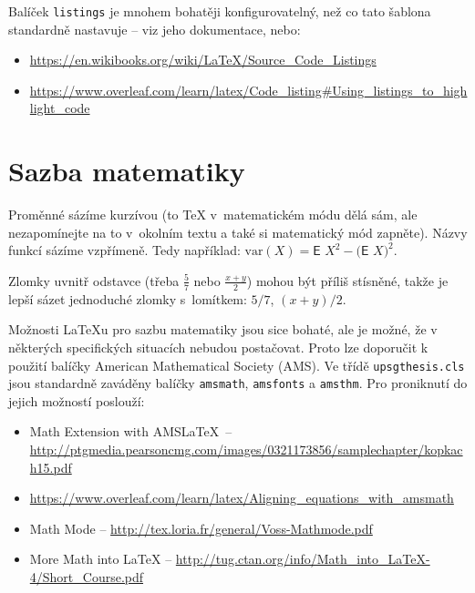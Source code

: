 
Balíček \texttt{listings} je mnohem bohatěji konfigurovatelný, než co tato šablona standardně nastavuje -- viz jeho dokumentace, nebo:
\begin{itemize}
\item \url{https://en.wikibooks.org/wiki/LaTeX/Source_Code_Listings}
\item \url{https://www.overleaf.com/learn/latex/Code_listing#Using_listings_to_highlight_code}
\end{itemize}


\section{Sazba matematiky}
Proměnné sázíme kurzívou (to \TeX{} v~matematickém módu dělá sám, ale
nezapomínejte na to v~okolním textu a také si matematický mód zapněte).
Názvy funkcí sázíme vzpřímeně. Tedy například:
$\textrm{var} (X) = \textsf{E~} X^2 - \bigl(\textsf{E~} X \bigr)^2$.

Zlomky uvnitř odstavce (třeba $$ nebo $$) mohou
být příliš stísněné, takže je lepší sázet jednoduché zlomky s~lomítkem:
$5/7$, $(x+y)/2$.

Možnosti \LaTeX u pro sazbu matematiky jsou sice bohaté, ale je možné, že v některých specifických situacích nebudou postačovat. Proto lze doporučit k použití balíčky American Mathematical Society (AMS). Ve třídě \texttt{upsgthesis.cls} jsou standardně zaváděny balíčky \texttt{amsmath}, \texttt{amsfonts} a \texttt{amsthm}. Pro proniknutí do jejich možností poslouží:
\begin{itemize}
\item Math Extension with AMS\LaTeX\ -- \url{http://ptgmedia.pearsoncmg.com/images/0321173856/samplechapter/kopkach15.pdf}
\item \url{https://www.overleaf.com/learn/latex/Aligning_equations_with_amsmath}
\item Math Mode -- \url{http://tex.loria.fr/general/Voss-Mathmode.pdf}
\item More Math into LaTeX -- \url{http://tug.ctan.org/info/Math_into_LaTeX-4/Short_Course.pdf}
\end{itemize}
